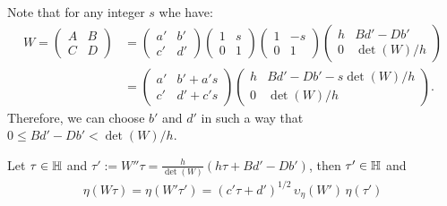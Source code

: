 \documentclass{article}
\begin{document}
Note that for any integer $s$ whe have:
\begin{align}
W = \begin{pmatrix}A&B\\C&D\end{pmatrix}
&=\begin{pmatrix}a'&b'\\c'&d'\end{pmatrix}
  \begin{pmatrix}1& s\\0&1\end{pmatrix}
  \begin{pmatrix}1&-s\\0&1\end{pmatrix}
  \begin{pmatrix}h &B d'- D b'\\0 &\det(W) / h\end{pmatrix}
  \\
&=
  \begin{pmatrix} a'&b' + a' s\\ c'&d' + c' s \end{pmatrix}
  \begin{pmatrix}
    h &B d'- D b'- s \det(W) / h\\
    0 &\det(W) / h\end{pmatrix}.
\end{align}
Therefore, we can choose $b'$ and $d'$ in such a way that
$0 \le B d'-D b' < \det(W)/h$.

Let $\tau\in\mathbb{H}$ and
$\tau' := W''\tau = \frac{h}{\det(W)}(h\tau + B d'- D b')$, then
$\tau'\in\mathbb{H}$ and
\begin{gather}
\eta(W\tau) =
\eta(W'\tau') =
(c'\tau+d')^{1/2}\,\upsilon_\eta(W')\,\eta(\tau')
\label{eq:eta-W-transformation}
\end{gather}
\end{document}
